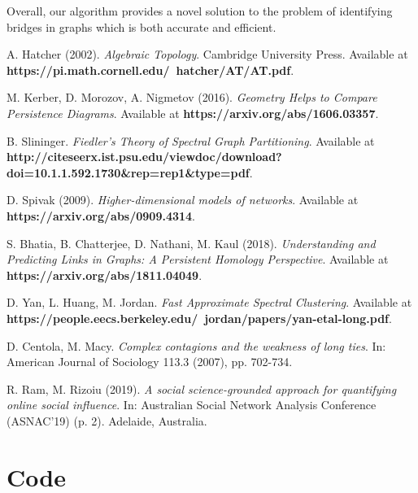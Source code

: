 \documentclass[12pt,a4paper]{amsart}
\numberwithin{equation}{section}
\theoremstyle{plain}
\theoremstyle{definition}
\begin{document}
Overall, our algorithm provides a novel solution to the problem of identifying bridges in graphs which is both accurate and efficient.

\newpage

\begin{thebibliography}{99}

 A. Hatcher (2002). \textit{Algebraic Topology}. Cambridge University Press. Available at \textbf{https://pi.math.cornell.edu/~hatcher/AT/AT.pdf}.

 M. Kerber, D. Morozov, A. Nigmetov (2016). \textit{Geometry Helps to Compare Persistence Diagrams}. Available at \textbf{https://arxiv.org/abs/1606.03357}.

 B. Slininger. \textit{Fiedler's Theory of Spectral Graph Partitioning}. Available at \textbf{http://citeseerx.ist.psu.edu/viewdoc/download?doi=10.1.1.592.1730\&rep=rep1\&type=pdf}.

 D. Spivak (2009). \textit{Higher-dimensional models of networks}. Available at \textbf{https://arxiv.org/abs/0909.4314}.

 S. Bhatia, B. Chatterjee, D. Nathani, M. Kaul (2018). \textit{Understanding and Predicting Links in Graphs: A Persistent Homology Perspective}. Available at \textbf{https://arxiv.org/abs/1811.04049}.

 D. Yan, L. Huang, M. Jordan. \textit{Fast Approximate Spectral Clustering}. Available at \textbf{https://people.eecs.berkeley.edu/~jordan/papers/yan-etal-long.pdf}.

 D. Centola, M. Macy. \textit{Complex contagions and the weakness of long ties}. In: American Journal of Sociology 113.3 (2007), pp. 702-734.

 R. Ram, M. Rizoiu (2019). \textit{A social science-grounded approach for quantifying online social influence}. In: Australian Social Network Analysis Conference (ASNAC'19) (p. 2). Adelaide, Australia.

\end{thebibliography}

\newpage

\section*{Code}
\end{document}

